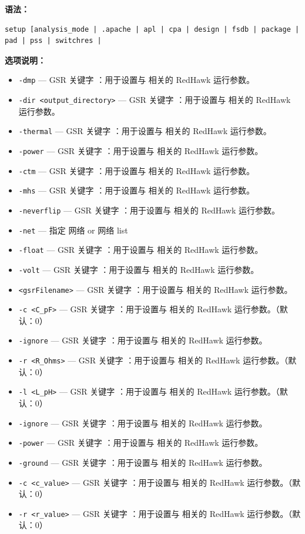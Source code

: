 \textbf{语法：}
\begin{lstlisting}
setup [analysis_mode | .apache | apl | cpa | design | fsdb | package | pad | pss | switchres |
\end{lstlisting}

\textbf{选项说明：}
\begin{itemize}
\item \texttt{-dmp} — GSR 关键字 ：用于设置与  相关的 RedHawk 运行参数。
\item \texttt{-dir <output\_directory>} — GSR 关键字 ：用于设置与  相关的 RedHawk 运行参数。
\item \texttt{-thermal} — GSR 关键字 ：用于设置与  相关的 RedHawk 运行参数。
\item \texttt{-power} — GSR 关键字 ：用于设置与  相关的 RedHawk 运行参数。
\item \texttt{-ctm} — GSR 关键字 ：用于设置与  相关的 RedHawk 运行参数。
\item \texttt{-mhs} — GSR 关键字 ：用于设置与  相关的 RedHawk 运行参数。
\item \texttt{-neverflip} — GSR 关键字 ：用于设置与  相关的 RedHawk 运行参数。
\item \texttt{-net} — 指定 网络 or 网络 list
\item \texttt{-float} — GSR 关键字 ：用于设置与  相关的 RedHawk 运行参数。
\item \texttt{-volt} — GSR 关键字 ：用于设置与  相关的 RedHawk 运行参数。
\item \texttt{<gsrFilename>} — GSR 关键字 ：用于设置与  相关的 RedHawk 运行参数。
\item \texttt{-c <C\_pF>} — GSR 关键字 ：用于设置与  相关的 RedHawk 运行参数。（默认：0）
\item \texttt{-ignore} — GSR 关键字 ：用于设置与  相关的 RedHawk 运行参数。
\item \texttt{-r <R\_Ohms>} — GSR 关键字 ：用于设置与  相关的 RedHawk 运行参数。（默认：0）
\item \texttt{-l <L\_pH>} — GSR 关键字 ：用于设置与  相关的 RedHawk 运行参数。（默认：0）
\item \texttt{-ignore} — GSR 关键字 ：用于设置与  相关的 RedHawk 运行参数。
\item \texttt{-power} — GSR 关键字 ：用于设置与  相关的 RedHawk 运行参数。
\item \texttt{-ground} — GSR 关键字 ：用于设置与  相关的 RedHawk 运行参数。
\item \texttt{-c <c\_value>} — GSR 关键字 ：用于设置与  相关的 RedHawk 运行参数。（默认：0）
\item \texttt{-r <r\_value>} — GSR 关键字 ：用于设置与  相关的 RedHawk 运行参数。（默认：0）

\end{itemize}
